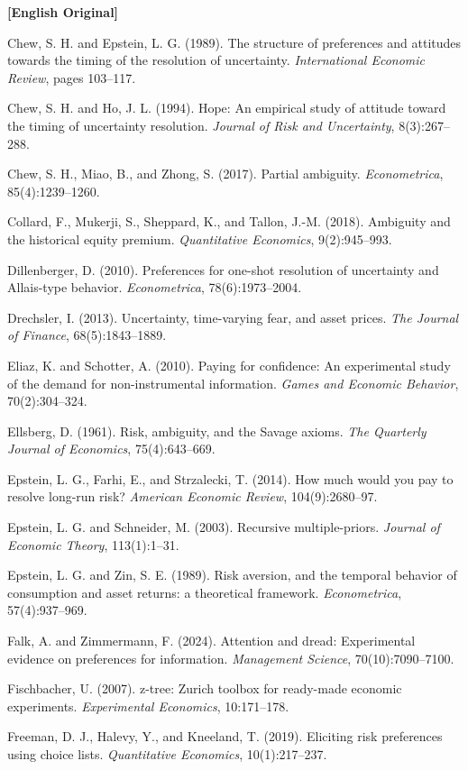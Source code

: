 \documentclass[12pt,a4paper]{ctexart}
\newenvironment{original}{%
  \par\medskip\noindent\textbf{[English Original]}\par\smallskip
  \color{black}\small
}{%
  \par\medskip
}
\theoremstyle{definition}
\theoremstyle{remark}
\begin{document}
\begin{original}
Chew, S. H. and Epstein, L. G. (1989). The structure of preferences and attitudes towards the timing of the resolution of uncertainty. \textit{International Economic Review}, pages 103--117.

Chew, S. H. and Ho, J. L. (1994). Hope: An empirical study of attitude toward the timing of uncertainty resolution. \textit{Journal of Risk and Uncertainty}, 8(3):267--288.

Chew, S. H., Miao, B., and Zhong, S. (2017). Partial ambiguity. \textit{Econometrica}, 85(4):1239--1260.

Collard, F., Mukerji, S., Sheppard, K., and Tallon, J.-M. (2018). Ambiguity and the historical equity premium. \textit{Quantitative Economics}, 9(2):945--993.

Dillenberger, D. (2010). Preferences for one-shot resolution of uncertainty and Allais-type behavior. \textit{Econometrica}, 78(6):1973--2004.

Drechsler, I. (2013). Uncertainty, time-varying fear, and asset prices. \textit{The Journal of Finance}, 68(5):1843--1889.

Eliaz, K. and Schotter, A. (2010). Paying for confidence: An experimental study of the demand for non-instrumental information. \textit{Games and Economic Behavior}, 70(2):304--324.

Ellsberg, D. (1961). Risk, ambiguity, and the Savage axioms. \textit{The Quarterly Journal of Economics}, 75(4):643--669.

Epstein, L. G., Farhi, E., and Strzalecki, T. (2014). How much would you pay to resolve long-run risk? \textit{American Economic Review}, 104(9):2680--97.

Epstein, L. G. and Schneider, M. (2003). Recursive multiple-priors. \textit{Journal of Economic Theory}, 113(1):1--31.

Epstein, L. G. and Zin, S. E. (1989). Risk aversion, and the temporal behavior of consumption and asset returns: a theoretical framework. \textit{Econometrica}, 57(4):937--969.

Falk, A. and Zimmermann, F. (2024). Attention and dread: Experimental evidence on preferences for information. \textit{Management Science}, 70(10):7090--7100.

Fischbacher, U. (2007). z-tree: Zurich toolbox for ready-made economic experiments. \textit{Experimental Economics}, 10:171--178.

Freeman, D. J., Halevy, Y., and Kneeland, T. (2019). Eliciting risk preferences using choice lists. \textit{Quantitative Economics}, 10(1):217--237.


\end{original}
\end{document}
